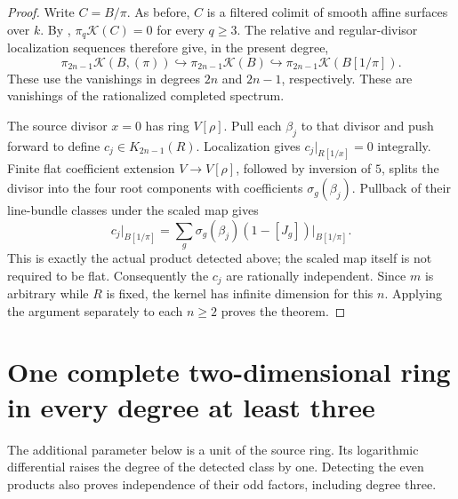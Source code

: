 \begin{proof}
Write $C=B/\pi$.  As before, $C$ is a filtered colimit of smooth
affine surfaces over $k$.  By
\cite[Theorem~8.4]{GeisserLevineCharP},
$\pi_q\mathcal K(C)=0$ for every $q\geq3$.
The relative and regular-divisor localization sequences therefore
give, in the present degree,
\[
 \pi_{2n-1}\mathcal K(B,(\pi))
 \hookrightarrow\pi_{2n-1}\mathcal K(B)
 \hookrightarrow\pi_{2n-1}\mathcal K(B[1/\pi]).
\]
These use the vanishings in degrees $2n$ and $2n-1$, respectively.
These are vanishings of the rationalized completed spectrum.

The source divisor $x=0$ has ring $V[\rho]$.
Pull each $\beta_j$ to that divisor and push forward to define
$c_j\in K_{2n-1}(R)$.  Localization gives $c_j|_{R[1/x]}=0$
integrally.  Finite flat coefficient extension $V\to V[\rho]$,
followed by inversion of $5$, splits the divisor into the four
root components with coefficients $\sigma_g(\beta_j)$.
Pullback of their line-bundle classes under the scaled map gives
\[
 c_j|_{B[1/\pi]}
   =\sum_g\sigma_g(\beta_j)(1-[J_g])\big|_{B[1/\pi]}.
\]
This is exactly the actual product detected above; the scaled map
itself is not required to be flat.
Consequently the $c_j$ are rationally independent.
Since $m$ is arbitrary while $R$ is fixed, the kernel has infinite
dimension for this $n$.  Applying the argument separately to each
$n\geq2$ proves the theorem.
\end{proof}

\section{One complete two-dimensional ring in every degree at least three}
\label{d2ext:dimtwoAllDegreesFixedRing}

The additional parameter below is a unit of the source ring.
Its logarithmic differential raises the degree of the detected
class by one.  Detecting the even products also proves independence
of their odd factors, including degree three.

